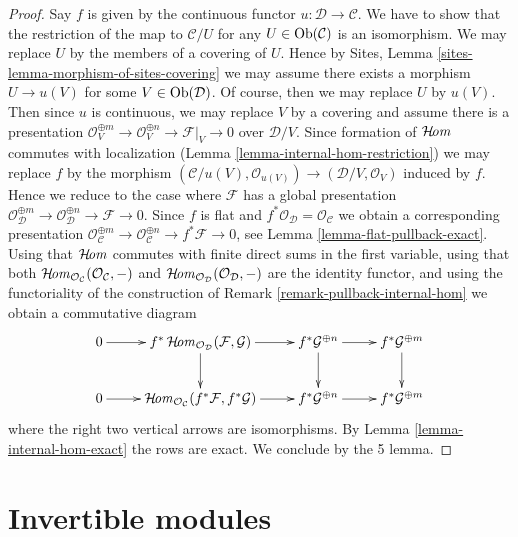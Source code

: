 \begin{proof}
Say $f$ is given by the continuous functor $u : \mathcal{D} \to \mathcal{C}$.
We have to show that the restriction of the map to $\mathcal{C}/U$
for any $U \in \mathop{\mathrm{Ob}}\nolimits(\mathcal{C})$ is an isomorphism.
We may replace $U$ by the members of a covering of $U$.
Hence by Sites, Lemma \ref{sites-lemma-morphism-of-sites-covering}
we may assume there exists a morphism $U \to u(V)$ for some
$V \in \mathop{\mathrm{Ob}}\nolimits(\mathcal{D})$. Of course, then we may replace $U$ by $u(V)$.
Then since $u$ is continuous, we may replace $V$ by a covering
and assume there is a presentation
$\mathcal{O}_V^{\oplus m} \to \mathcal{O}_V^{\oplus n} \to
\mathcal{F}|_V \to 0$
over $\mathcal{D}/V$. Since formation of $\mathop{\mathcal{H}\!\mathit{om}}\nolimits$
commutes with localization (Lemma \ref{lemma-internal-hom-restriction})
we may replace $f$ by the morphism
$(\mathcal{C}/u(V), \mathcal{O}_{u(V)}) \to
(\mathcal{D}/V, \mathcal{O}_V)$ induced by $f$.
Hence we reduce to the case where $\mathcal{F}$ has a global
presentation
$\mathcal{O}_\mathcal{D}^{\oplus m} \to \mathcal{O}_\mathcal{D}^{\oplus n} \to
\mathcal{F} \to 0$.
Since $f$ is flat and $f^*\mathcal{O}_\mathcal{D} = \mathcal{O}_\mathcal{C}$
we obtain a corresponding presentation
$\mathcal{O}_\mathcal{C}^{\oplus m} \to \mathcal{O}_\mathcal{C}^{\oplus n} \to
f^*\mathcal{F} \to 0$, see
Lemma \ref{lemma-flat-pullback-exact}.
Using that $\mathop{\mathcal{H}\!\mathit{om}}\nolimits$ commutes with finite direct sums in the
first variable, using that both
$\mathop{\mathcal{H}\!\mathit{om}}\nolimits_{\mathcal{O}_\mathcal{C}}(\mathcal{O}_\mathcal{C}, -)$ and
$\mathop{\mathcal{H}\!\mathit{om}}\nolimits_{\mathcal{O}_\mathcal{D}}(\mathcal{O}_\mathcal{D}, -)$
are the identity functor, and using the
functoriality of the construction of
Remark \ref{remark-pullback-internal-hom}
we obtain a commutative diagram
$$
\xymatrix{
0 \ar[r] &
f^*\SheafHom_{\mathcal{O}_\mathcal{D}}(\mathcal{F}, \mathcal{G})
\ar[d] \ar[r] &
f^*\mathcal{G}^{\oplus n} \ar[d] \ar[r] &
f^*\mathcal{G}^{\oplus m} \ar[d] \\
0 \ar[r] &
\SheafHom_{\mathcal{O}_\mathcal{C}}(f^*\mathcal{F}, f^*\mathcal{G})
\ar[r] &
f^*\mathcal{G}^{\oplus n} \ar[r] &
f^*\mathcal{G}^{\oplus m}
}
$$
where the right two vertical arrows are isomorphisms.
By Lemma \ref{lemma-internal-hom-exact} the rows are exact.
We conclude by the 5 lemma.
\end{proof}







\section{Invertible modules}
\label{section-invertible}

